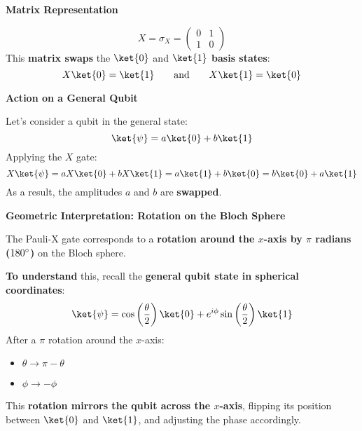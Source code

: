 \highspace
\begin{flushleft}
   \textcolor{Green3}{ \textbf{Matrix Representation}}
\end{flushleft}
\begin{equation}
   X = \sigma_{X} =
   \begin{pmatrix}
      0 & 1 \\ 1 & 0
   \end{pmatrix}
\end{equation}
This \textbf{matrix swaps} the $\ket{0}$ and $\ket{1}$ \textbf{basis states}:
\begin{equation}
   X\ket{0} = \ket{1} \hspace{2em} \text{and} \hspace{2em} X\ket{1} = \ket{0}
\end{equation}

\highspace
\begin{flushleft}
   \textcolor{Green3}{ \textbf{Action on a General Qubit}}
\end{flushleft}
Let's consider a qubit in the general state:
\begin{equation*}
   \ket{\psi} = a\ket{0} + b\ket{1}
\end{equation*}
Applying the $X$ gate:
\begin{equation*}
   X\ket{\psi} = a X \ket{0} + b X \ket{1} = a \ket{1} + b \ket{0} = b \ket{0} + a \ket{1}
\end{equation*}
As a result, the amplitudes $a$ and $b$ are \textbf{swapped}.

\highspace
\begin{flushleft}
   \textcolor{Green3}{ \textbf{Geometric Interpretation: Rotation on the Bloch Sphere}}
\end{flushleft}
The Pauli-X gate corresponds to a \textbf{rotation around the $x$-axis by $\pi$ radians ($180\degree$)} on the Bloch sphere.

\highspace
\textbf{To understand} this, recall the \textbf{general qubit state in spherical coordinates}:
\begin{equation*}
   \ket{\psi} = \cos\left(\dfrac{\theta}{2}\right) \ket{0} + e^{i \phi} \sin\left(\dfrac{\theta}{2}\right) \ket{1}
\end{equation*}
After a $\pi$ rotation around the $x$-axis:
\begin{itemize}
   \item $\theta \rightarrow \pi - \theta$
   \item $\phi \rightarrow -\phi$ 
\end{itemize}
This \textbf{rotation mirrors the qubit across the $x$-axis}, flipping its position between $\ket{0}$ and $\ket{1}$, and adjusting the phase accordingly.

